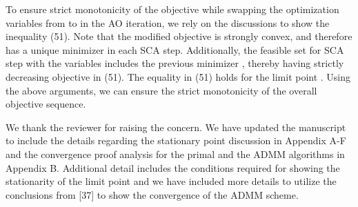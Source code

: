 \begin{enumerate}
To ensure strict monotonicity of the objective while swapping the optimization variables from \eqn{\mx,\mz} to \eqn{\my,\mz} in the  \ac{AO} iteration, we rely on the discussions to show the inequality (51). Note that the modified objective  is strongly convex, and therefore has a unique minimizer in each \ac{SCA} step. Additionally, the feasible set  for  \ac{SCA} step with the variables \eqn{\my,\mz} includes the previous minimizer , thereby having strictly decreasing objective in (51). The equality in (51) holds for the limit point . Using the above arguments, we can ensure the strict monotonicity of the overall objective sequence.

 

\resp We thank the reviewer for raising the concern. We have updated the manuscript to include the details regarding the stationary point discussion in Appendix A-F and the convergence proof analysis for the primal and the \ac{ADMM} algorithms in Appendix B. Additional detail includes the conditions required for showing the stationarity of the limit point and we have included more details to utilize the conclusions from [37] to show the convergence of the ADMM scheme.

\end{enumerate}
